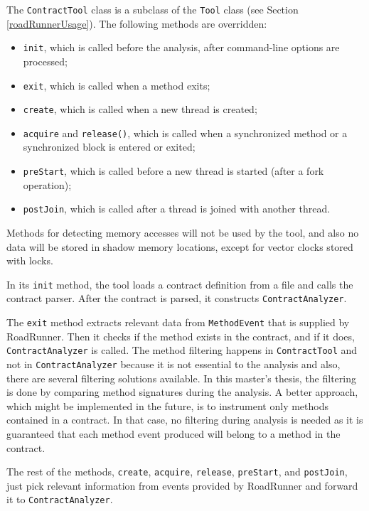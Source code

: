 The \texttt{ContractTool} class is a subclass of the \texttt{Tool} class (see
Section \ref{roadRunnerUsage}). The following methods are overridden:
\begin{itemize}
    \item \texttt{init}, which is called before the analysis, after
        command-line options are processed;
    \item \texttt{exit}, which is called when a method exits;
    \item \texttt{create}, which is called when a new thread is created;
    \item \texttt{acquire} and \texttt{release()}, which is called when a
        synchronized method or a synchronized block is entered or exited;
    \item \texttt{preStart}, which is called before a new thread is started
        (after a fork operation);
    \item \texttt{postJoin}, which is called after a thread is joined with
        another thread.
\end{itemize}

Methods for detecting memory accesses will not be used by the tool, and also no
data will be stored in shadow memory locations, except for vector clocks stored
with locks.

In its \texttt{init} method, the tool loads a contract definition from a file
and calls the contract parser. After the contract is parsed, it constructs
\texttt{ContractAnalyzer}.

The \texttt{exit} method extracts relevant data from \texttt{MethodEvent} that
is supplied by RoadRunner. Then it checks if the method exists in the contract,
and if it does, \texttt{ContractAnalyzer} is called. The method filtering
happens in \texttt{ContractTool} and not in \texttt{ContractAnalyzer} because it
is not essential to the analysis and also, there are several filtering solutions
available. In this master's thesis, the filtering is done by comparing method
signatures during the analysis. A better approach, which might be implemented in
the future, is to instrument only methods contained in a contract. In that case,
no filtering during analysis is needed as it is guaranteed that each method
event produced will belong to a method in the contract.

The rest of the methods, \texttt{create}, \texttt{acquire}, \texttt{release},
\texttt{preStart}, and \texttt{postJoin}, just pick relevant information from
events provided by RoadRunner and forward it to \texttt{ContractAnalyzer}.



